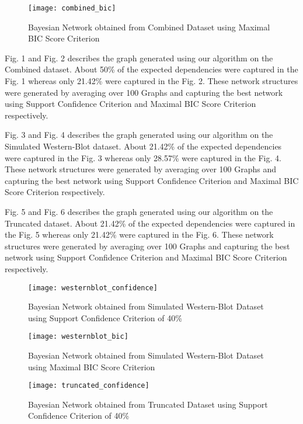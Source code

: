 \documentclass[conference]{IEEEtran}
\begin{document}
\begin{figure}[h]
\centering
\texttt{[image: combined\_bic]}
\label{fig2}
\caption{Bayesian Network obtained from Combined Dataset using Maximal BIC Score Criterion}
\end{figure}
\par
Fig. 1 and Fig. 2 describes the graph generated using our algorithm on the Combined dataset. About 50\% of the expected dependencies were captured in the Fig. 1 whereas only 21.42\% were captured in the Fig. 2. These network structures were generated by averaging over 100 Graphs and capturing the best network using Support Confidence Criterion and Maximal BIC Score Criterion respectively.
\par
Fig. 3 and Fig. 4 describes the graph generated using our algorithm on the Simulated Western-Blot dataset. About 21.42\% of the expected dependencies were captured in the Fig. 3 whereas only 28.57\% were captured in the Fig. 4. These network structures were generated by averaging over 100 Graphs and capturing the best network using Support Confidence Criterion and Maximal BIC Score Criterion respectively.
\par
Fig. 5 and Fig. 6 describes the graph generated using our algorithm on the Truncated dataset. About 21.42\% of the expected dependencies were captured in the Fig. 5 whereas only 21.42\% were captured in the Fig. 6. These network structures were generated by averaging over 100 Graphs and capturing the best network using Support Confidence Criterion and Maximal BIC Score Criterion respectively.

\begin{figure}[h]
\centering
\texttt{[image: westernblot\_confidence]}
\label{fig3}
\caption{Bayesian Network obtained from Simulated Western-Blot Dataset using Support Confidence Criterion of 40\%}
\end{figure}

\begin{figure}[h]
\centering
\texttt{[image: westernblot\_bic]}
\label{fig4}
\caption{Bayesian Network obtained from Simulated Western-Blot Dataset using Maximal BIC Score Criterion}
\end{figure}

\begin{figure}[h]
\centering
\texttt{[image: truncated\_confidence]}
\label{fig5}
\caption{Bayesian Network obtained from Truncated Dataset using Support Confidence Criterion of 40\%}
\end{figure}
\end{document}
